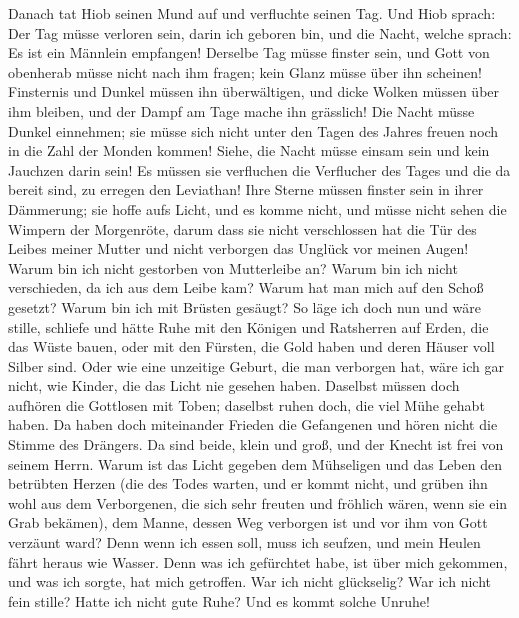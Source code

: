 Danach tat Hiob seinen Mund auf und verfluchte seinen
Tag.  Und Hiob sprach:  Der Tag müsse
verloren sein, darin ich geboren bin, und die Nacht, welche sprach: Es
ist ein Männlein empfangen!  Derselbe Tag müsse finster
sein, und Gott von obenherab müsse nicht nach ihm fragen; kein Glanz
müsse über ihn scheinen!  Finsternis und Dunkel müssen ihn
überwältigen, und dicke Wolken müssen über ihm bleiben, und der Dampf am
Tage mache ihn grässlich!  Die Nacht müsse Dunkel
einnehmen; sie müsse sich nicht unter den Tagen des Jahres freuen noch
in die Zahl der Monden kommen!  Siehe, die Nacht müsse
einsam sein und kein Jauchzen darin sein!  Es müssen sie
verfluchen die Verflucher des Tages und die da bereit sind, zu erregen
den Leviathan!  Ihre Sterne müssen finster sein in ihrer
Dämmerung; sie hoffe aufs Licht, und es komme nicht, und müsse nicht
sehen die Wimpern der Morgenröte,  darum dass sie nicht
verschlossen hat die Tür des Leibes meiner Mutter und nicht verborgen
das Unglück vor meinen Augen!  Warum bin ich nicht
gestorben von Mutterleibe an? Warum bin ich nicht verschieden, da ich
aus dem Leibe kam?  Warum hat man mich auf den Schoß
gesetzt? Warum bin ich mit Brüsten gesäugt?  So läge ich
doch nun und wäre stille, schliefe und hätte Ruhe  mit
den Königen und Ratsherren auf Erden, die das Wüste bauen,
 oder mit den Fürsten, die Gold haben und deren Häuser
voll Silber sind.  Oder wie eine unzeitige Geburt, die
man verborgen hat, wäre ich gar nicht, wie Kinder, die das Licht nie
gesehen haben.  Daselbst müssen doch aufhören die
Gottlosen mit Toben; daselbst ruhen doch, die viel Mühe gehabt haben.
 Da haben doch miteinander Frieden die Gefangenen und
hören nicht die Stimme des Drängers.  Da sind beide,
klein und groß, und der Knecht ist frei von seinem Herrn.
 Warum ist das Licht gegeben dem Mühseligen und das Leben
den betrübten Herzen  (die des Todes warten, und er kommt
nicht, und grüben ihn wohl aus dem Verborgenen,  die sich
sehr freuten und fröhlich wären, wenn sie ein Grab bekämen),
 dem Manne, dessen Weg verborgen ist und vor ihm von Gott
verzäunt ward?  Denn wenn ich essen soll, muss ich
seufzen, und mein Heulen fährt heraus wie Wasser.  Denn
was ich gefürchtet habe, ist über mich gekommen, und was ich sorgte, hat
mich getroffen.  War ich nicht glückselig? War ich nicht
fein stille? Hatte ich nicht gute Ruhe? Und es kommt solche Unruhe!

